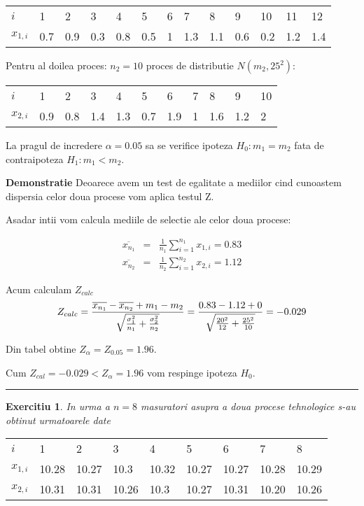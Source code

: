 \documentclass{article}
\newtheorem{exercise}[theorem]{Exercitiu}
\newenvironment{proof}[1][Proof]{\noindent\textbf{Demonstratie} }{\ \rule{0.5em}{0.5em}}
\begin{document}
\begin{tabular}{lllllllllllll}
$i$ & 1 & 2 & 3 & 4 & 5 & 6 & 7 & 8 & 9 & 10 & 11 & 12 \\ 
$x_{1,i}$ & 0.7 & 0.9 & 0.3 & 0.8 & 0.5 & 1 & 1.3 & 1.1 & 0.6 & 0.2 & 1.2 & 
1.4%
\end{tabular}

Pentru al doilea proces: $n_{2}=10$ proces de distributie $N(m_{2},25^{2})$:

\begin{tabular}{lllllllllll}
$i$ & 1 & 2 & 3 & 4 & 5 & 6 & 7 & 8 & 9 & 10 \\ 
$x_{2,i}$ & 0.9 & 0.8 & 1.4 & 1.3 & 0.7 & 1.9 & 1 & 1.6 & 1.2 & 2%
\end{tabular}

La pragul de incredere $\alpha =0.05$ sa se verifice ipoteza $%
H_{0}:m_{1}=m_{2}$ fata de contraipoteza $H_{1}:m_{1}<m_{2}$.

\begin{proof}
Deoarece avem un test de egalitate a mediilor cind cunoastem dispersia celor
doua procese vom aplica testul Z.

Asadar intii vom calcula mediile de selectie ale celor doua procese:

\begin{eqnarray*}
\overline{x_{n_{1}}} &=&\frac{1}{n_{1}}\sum_{i=1}^{n_{1}}x_{1,i}=0.83 \\
\overline{x_{n_{2}}} &=&\frac{1}{n_{2}}\sum_{i=1}^{n_{2}}x_{2,i}=1.12
\end{eqnarray*}

Acum calculam $Z_{calc}$%
\[
Z_{calc}=\frac{\overline{x_{n_{1}}}-\overline{x_{n_{2}}}+m_{1}-m_{2}}{\sqrt{%
\frac{\sigma _{1}^{2}}{n_{1}}+\frac{\sigma _{2}^{2}}{n_{2}}}}=\frac{%
0.83-1.12+0}{\sqrt{\frac{20^{2}}{12}+\frac{25^{2}}{10}}}=-0.029
\]

Din tabel obtine $Z_{\alpha }=Z_{0.05}=1.96$.

Cum $Z_{cal}=-0.029<Z_{\alpha }=1.96$ vom respinge ipoteza $H_{0}$.
\end{proof}

\begin{exercise}
In urma a $n=8$ masuratori asupra a doua procese tehnologice s-au obtinut
urmatoarele date
\end{exercise}

\begin{tabular}{lllllllll}
$i$ & 1 & 2 & 3 & 4 & 5 & 6 & 7 & 8 \\ 
$x_{1,i}$ & 10.28 & 10.27 & 10.3 & 10.32 & 10.27 & 10.27 & 10.28 & 10.29 \\ 
$x_{2,i}$ & 10.31 & 10.31 & 10.26 & 10.3 & 10.27 & 10.31 & 10.20 & 10.26%
\end{tabular}
\end{document}
